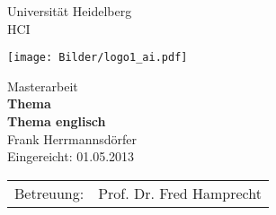\begin{titlepage}
\vspace*{1cm}
\begin{center}
\LARGE
Universit\"at Heidelberg\\
HCI\\
\vspace{1cm}
\begin{center}
	\texttt{[image: Bilder/logo1\_ai.pdf]}
\end{center}
\vspace{2cm}
Masterarbeit\\
\vspace{1cm}
{\huge\bf
Thema}\\
\vspace{1cm}
{\large\bf Thema englisch}\\
\vspace{1cm}
\LARGE
Frank Herrmannsd\"orfer\\
\vspace{2cm}
\large
Eingereicht: 01.05.2013\\
\vspace{1cm}
\begin{tabular}{ll}
Betreuung:& Prof. Dr. Fred Hamprecht\\
\end{tabular}
\end{center}
\end{titlepage}